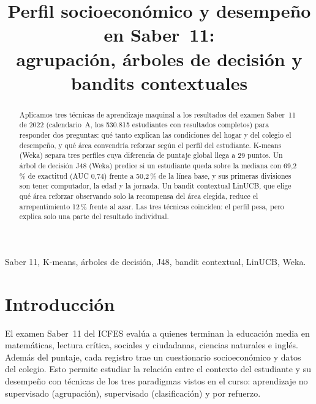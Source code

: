 \documentclass[conference]{IEEEtran}
\begin{document}
\title{Perfil socioeconómico y desempeño en Saber~11:\\ agrupación, árboles de decisión y bandits contextuales}

\author{
}

\maketitle

\begin{abstract}
Aplicamos tres técnicas de aprendizaje maquinal a los resultados del examen Saber~11 de 2022 (calendario~A, los 530.815 estudiantes con resultados completos) para responder dos preguntas: qué tanto explican las condiciones del hogar y del colegio el desempeño, y qué área convendría reforzar según el perfil del estudiante. K-means (Weka) separa tres perfiles cuya diferencia de puntaje global llega a 29 puntos. Un árbol de decisión J48 (Weka) predice si un estudiante queda sobre la mediana con 69,2\,\% de exactitud (AUC 0,74) frente a 50,2\,\% de la línea base, y sus primeras divisiones son tener computador, la edad y la jornada. Un bandit contextual LinUCB, que elige qué área reforzar observando solo la recompensa del área elegida, reduce el arrepentimiento 12\,\% frente al azar. Las tres técnicas coinciden: el perfil pesa, pero explica solo una parte del resultado individual.
\end{abstract}

\begin{IEEEkeywords}
Saber 11, K-means, árboles de decisión, J48, bandit contextual, LinUCB, Weka.
\end{IEEEkeywords}

\section{Introducción}
El examen Saber~11 del ICFES evalúa a quienes terminan la educación media en matemáticas, lectura crítica, sociales y ciudadanas, ciencias naturales e inglés. Además del puntaje, cada registro trae un cuestionario socioeconómico y datos del colegio. Esto permite estudiar la relación entre el contexto del estudiante y su desempeño con técnicas de los tres paradigmas vistos en el curso: aprendizaje no supervisado (agrupación), supervisado (clasificación) y por refuerzo.
\end{document}
